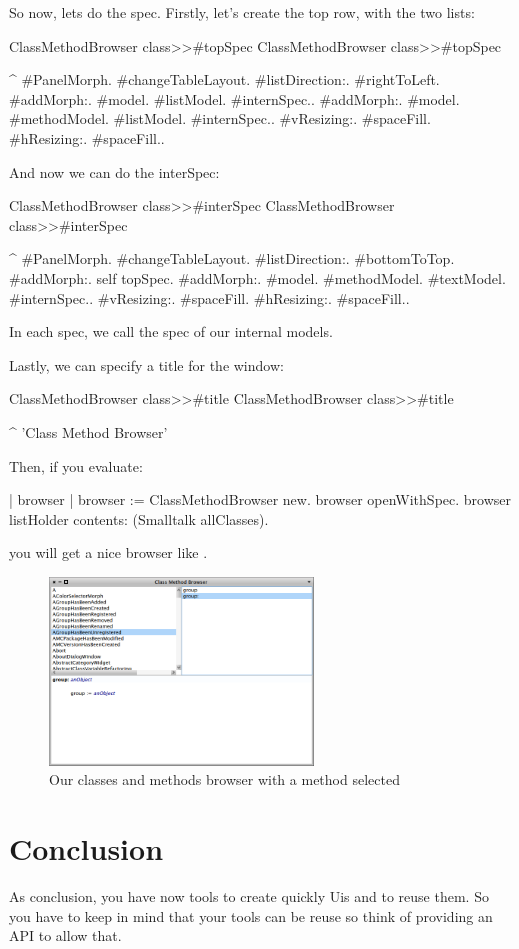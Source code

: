 \documentclass[a4paper,10pt,twoside]{book}
\begin{document}
So now, lets do the spec. Firstly, let's create the top row, with the two lists:
\begin{method}{ClassMethodBrowser class>>\#topSpec}
ClassMethodBrowser class>>#topSpec

	^{ #PanelMorph.
			#changeTableLayout.
			#listDirection:. #rightToLeft.
			#addMorph:. {#model. #listModel. #internSpec.}.
			#addMorph:. {#model. #methodModel. #listModel. #internSpec.}.
			#vResizing:. #spaceFill.
			#hResizing:. #spaceFill.}.
\end{method}

And now we can do the interSpec:

\begin{method}{ClassMethodBrowser class>>\#interSpec}
ClassMethodBrowser class>>#interSpec

	^ { #PanelMorph.
			#changeTableLayout.
			#listDirection:. #bottomToTop.
			#addMorph:. self topSpec.
			#addMorph:. {#model. #methodModel. #textModel. #internSpec.}.
			#vResizing:. #spaceFill.
			#hResizing:. #spaceFill.}.
\end{method}
In each spec, we call the spec of our internal models.

Lastly, we can specify a title for the window:
\begin{method}{ClassMethodBrowser class>>\#title}
ClassMethodBrowser class>>#title

	^ 'Class Method Browser'
\end{method}
Then, if you evaluate:

\begin{code}{}
| browser |
browser := ClassMethodBrowser new.
browser openWithSpec.
browser listHolder contents: (Smalltalk allClasses).
\end{code}
you will get a nice browser like .


\begin{figure}[ht]
\begin{center}
	\includegraphics[width=7cm]{MethodBrowser5}
	\caption{Our classes and methods browser with a method selected}
\end{center}
\end{figure}

\section{Conclusion}

As conclusion, you have now tools to create quickly Uis and to reuse them.
So you have to keep in mind that your tools can be reuse so think of providing an API to allow that.

\ifx\wholebook\relax\else
   
   
\end{document}
